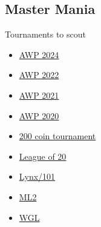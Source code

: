 \subsection{Master Mania}

Tournaments to scout
\begin{itemize}
    \item \href{https://www.warzone.com/MultiPlayer/Tournament?ID=56816}{AWP 2024}
    \item \href{https://www.warzone.com/MultiPlayer/Tournament?ID=50025}{AWP 2022}
    \item \href{https://www.warzone.com/MultiPlayer/Tournament?ID=43082}{AWP 2021}
    \item \href{https://www.warzone.com/MultiPlayer/Tournament?ID=39173}{AWP 2020}
    \item \href{https://www.warzone.com/MultiPlayer/Tournament?ID=45363}{200 coin tournament}
    \item \href{https://www.warzone.com/MultiPlayer/Tournament?ID=30786}{League of 20}
    \item \href{https://www.warzone.com/MultiPlayer/Tournament?ID=24540}{Lynx/101}
    \item \href{https://www.warzone.com/MultiPlayer/Tournament?ID=24420}{ML2}
    \item \href{https://www.warzone.com/MultiPlayer/Tournament?ID=24274}{WGL}
\end{itemize}


